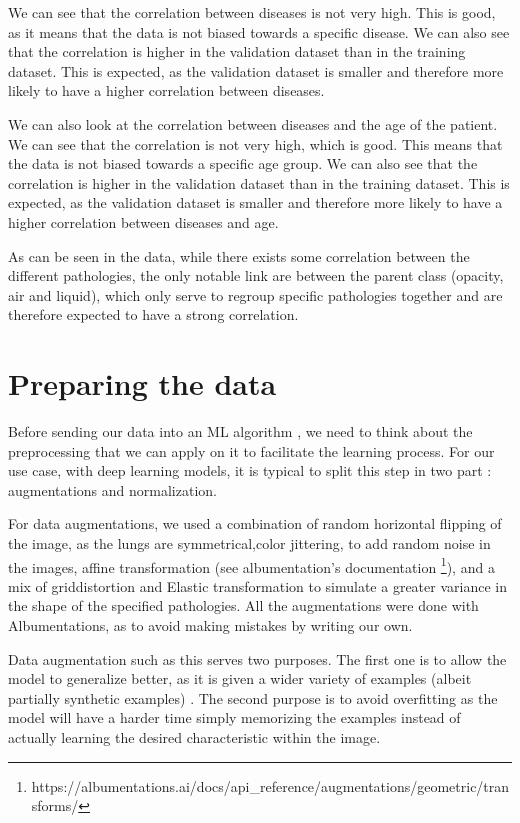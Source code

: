 \documentclass[11pt]{article}
\begin{document}
    We can see that the correlation between diseases is not very high. This is good, as it means that the data is not biased
    towards a specific disease. We can also see that the correlation is higher in the validation dataset than in the training
    dataset. This is expected, as the validation dataset is smaller and therefore more likely to have a higher correlation
    between diseases.

    We can also look at the correlation between diseases and the age of the patient. We can see that the correlation is not
    very high, which is good. This means that the data is not biased towards a specific age group. We can also see that the
    correlation is higher in the validation dataset than in the training dataset. This is expected, as the validation dataset
    is smaller and therefore more likely to have a higher correlation between diseases and age.

    As can be seen in the data, while there exists some correlation between the different pathologies, the only notable link
    are between the parent class (opacity, air and liquid), which only serve to regroup specific pathologies together and are therefore
    expected to have a strong correlation.



    \section{Preparing the data}



    Before sending our data into an ML algorithm , we need to think about the preprocessing that we can apply on it to facilitate
    the learning process. For our use case, with deep learning models, it is typical to split this step in two part : augmentations
    and normalization.


    For data augmentations, we used a combination of random horizontal flipping of the image, as the lungs are symmetrical,color jittering, to add random noise
    in the images, affine transformation (see albumentation's documentation \footnote{https://albumentations.ai/docs/api_reference/augmentations/geometric/transforms/}), and a mix of griddistortion and Elastic transformation to simulate a greater
    variance in the shape of the specified pathologies. All the augmentations were done with Albumentations, as to avoid making mistakes
    by writing our own\cite{albumentations}.

    Data augmentation such as this serves two purposes. The first one is to allow the model to generalize better, as it is given
    a wider variety of examples (albeit partially synthetic examples) . The second purpose is to avoid overfitting as the model will
    have a harder time simply memorizing the examples instead of actually learning the desired characteristic within the image.
\end{document}
